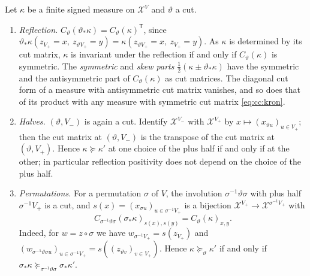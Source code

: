 \begin{remark}\label{rem:cut-symmetries}
Let $\kappa$ be a finite signed measure on $\mathcal X^V$ and $\vartheta$ a cut.
\begin{enumerate}[label=(\alph*)]
\item \emph{Reflection.} $C_\vartheta(\vartheta_*\kappa)=C_\vartheta(\kappa)^{\mathsf T}$,
 since $\vartheta_*\kappa(z_{V_+}=x,\ z_{\vartheta V_+}=y)
 =\kappa(z_{\vartheta V_+}=x,\ z_{V_+}=y)$. As $\kappa$ is determined by its cut
 matrix, $\kappa$ is invariant under the reflection if and only if
 $C_\vartheta(\kappa)$ is symmetric. The \emph{symmetric} and \emph{skew parts}
 $\frac12(\kappa\pm\vartheta_*\kappa)$ have the symmetric and the antisymmetric
 part of $C_\vartheta(\kappa)$ as cut matrices. The diagonal cut form of a
 measure with antisymmetric cut matrix vanishes, and so does that of its
 product with any measure with symmetric cut matrix \eqref{eq:cc:kron}.
\item \emph{Halves.} $(\vartheta,V_-)$ is again a cut. Identify
 $\mathcal X^{V_-}$ with $\mathcal X^{V_+}$ by $x\mapsto(x_{\vartheta u})_{u\in V_+}$;
 then the cut matrix at $(\vartheta,V_-)$ is the transpose of the cut matrix
 at $(\vartheta,V_+)$. Hence $\kappa\succeq\kappa'$ at one choice of the plus
 half if and only if at the other; in particular reflection positivity does
 not depend on the choice of the plus half.
\item \emph{Permutations.} For a permutation $\sigma$ of $V$, the involution
 $\sigma^{-1}\vartheta\sigma$ with plus half $\sigma^{-1}V_+$ is a cut, and
 $s(x)=(x_{\sigma u})_{u\in\sigma^{-1}V_+}$ is a bijection
 $\mathcal X^{V_+}\to\mathcal X^{\sigma^{-1}V_+}$ with
 \[
  C_{\sigma^{-1}\vartheta\sigma}(\sigma_*\kappa)_{s(x),s(y)}=C_\vartheta(\kappa)_{x,y}.
 \]
 Indeed, for $w=z\circ\sigma$ we have $w_{\sigma^{-1}V_+}=s(z_{V_+})$ and
 $(w_{\sigma^{-1}\vartheta\sigma u})_{u\in\sigma^{-1}V_+}=s((z_{\vartheta v})_{v\in V_+})$.
 Hence $\kappa\succeq_\vartheta\kappa'$ if and only if
 $\sigma_*\kappa\succeq_{\sigma^{-1}\vartheta\sigma}\sigma_*\kappa'$.
\end{enumerate}
\end{remark}

